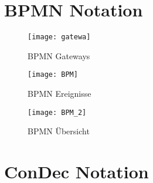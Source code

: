 \chapter{BPMN Notation}

\begin{figure}[!htbp]
\begin{center}
  \texttt{[image: gatewa]} %
  \caption{BPMN Gateways \cite{allweyer2013}}
  \label{fig:gateways}
\end{center}
\end{figure}


\begin{figure}[!htbp]
\begin{center}
  \texttt{[image: BPM]} %
  \caption{BPMN Ereignisse \cite{allweyer2013}}
  \label{fig:BPM}
\end{center}
\end{figure}

\begin{figure}[!htbp]
\begin{center}
  \texttt{[image: BPM\_2]} %
  \caption{BPMN Übersicht \cite{allweyer2013}}
  \label{fig:BPM_2}
\end{center}
\end{figure}



\chapter{ConDec Notation}

 
 
